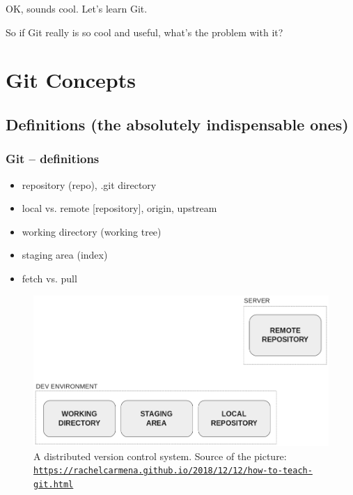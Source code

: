 \documentclass{beamer}
\begin{document}
    \begin{frame}{OK, sounds cool. Let's learn Git.}
        \begin{center}
            So if Git really is so cool and useful, what's the problem with it?

            \href{https://git-man-page-generator.lokaltog.net/}{}
        \end{center}

    \end{frame}


    \section{Git Concepts}

    \subsection{Definitions (the absolutely indispensable ones)}


    \begin{frame}
        \frametitle{Git -- definitions}
        \begin{itemize}
            \item repository (repo), .git directory
            \item local vs. remote [repository], origin, upstream
            \item working directory (working tree)
            \item staging area (index)
            \item fetch vs. pull
        \end{itemize}

    \end{frame}


    \begin{frame}
        \begin{figure}
            \includegraphics[width=\linewidth]{../figures/general-drawing.png}
            \caption{\footnotesize{A distributed version control system. Source of the picture:
                \href{https://rachelcarmena.github.io/2018/12/12/how-to-teach-git.html}
                {\texttt{https://rachelcarmena.github.io/2018/12/12/how-to-teach-git.html}}}}
        \end{figure}

    \end{frame}
\end{document}
